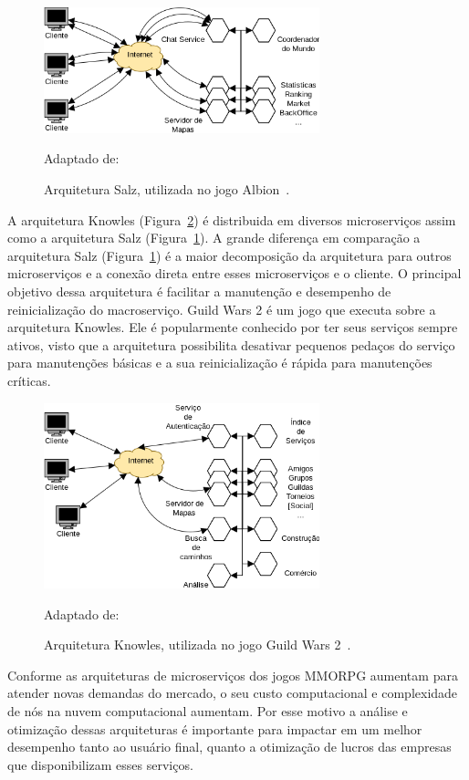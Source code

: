 \begin{figure}[htb!]
  \caption{Arquitetura Salz, utilizada no jogo Albion~\cite{albion_online_unite}.}
  \label{fig:salz}
  \includegraphics[width=8cm]{arquiteturas/salz.png}
  \centering

  Adaptado de:~\cite{albion_online_unite}
\end{figure}

A arquitetura Knowles (Figura~\ref{fig:knowles}) é distribuida em diversos microserviços assim como a arquitetura Salz (Figura~\ref{fig:salz}).
%
A grande diferença em comparação a arquitetura Salz (Figura~\ref{fig:salz}) é a maior decomposição da arquitetura para outros microserviços e a conexão direta entre esses microserviços e o cliente.
%
O principal objetivo dessa arquitetura é facilitar a manutenção e desempenho de reinicialização do macroserviço\cite{stephenclarkewillson2017}.
%
Guild Wars 2 é um jogo que executa sobre a arquitetura Knowles.
%
Ele é popularmente conhecido por ter seus serviços sempre ativos, visto que a arquitetura possibilita desativar pequenos pedaços do serviço para manutenções básicas e a sua reinicialização é rápida para manutenções críticas.

\begin{figure}[htb!]
  \caption{Arquitetura Knowles, utilizada no jogo Guild Wars 2~\cite{stephenclarkewillson2017}.}
  \label{fig:knowles}
  \includegraphics[width=8cm]{arquiteturas/knowles.png}
  \centering

  Adaptado de:~\cite{stephenclarkewillson2017}
\end{figure}

Conforme as arquiteturas de microserviços dos jogos \ac{MMORPG} aumentam para atender novas demandas do mercado, o seu custo computacional e complexidade de nós na nuvem computacional aumentam.
%
Por esse motivo a análise e otimização dessas arquiteturas é importante para impactar em um melhor desempenho tanto ao usuário final, quanto a otimização de lucros das empresas que disponibilizam esses serviços.

